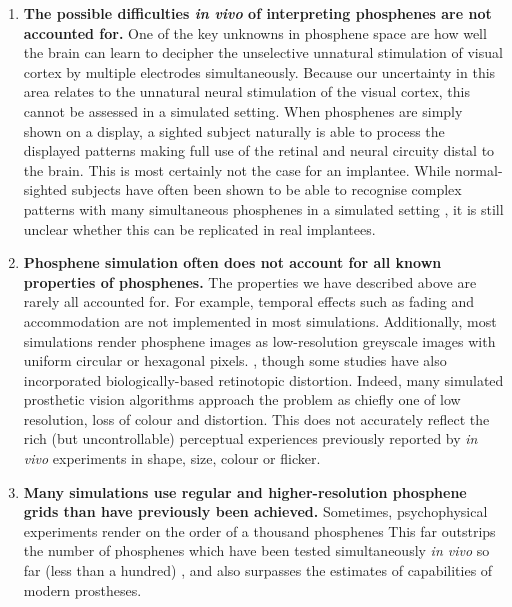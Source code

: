 \documentclass[a4paper,11pt,openany]{book}
\begin{document}
\begin{enumerate}
\item \textbf{The possible difficulties \emph{in vivo} of interpreting phosphenes are not accounted for.}
One of the key unknowns in phosphene space are how well the brain can learn to decipher the unselective unnatural stimulation of visual cortex by multiple electrodes simultaneously. \cite{beyeler_learning_2017}
Because our uncertainty in this area relates to the unnatural neural stimulation of the visual cortex, this cannot be assessed in a simulated setting.
When phosphenes are simply shown on a display, a sighted subject naturally is able to process the displayed patterns making full use of the retinal and neural circuity distal to the brain.
This is most certainly not the case for an implantee.
While normal-sighted subjects have often been shown to be able to recognise complex patterns with many simultaneous phosphenes in a simulated setting \cite{chen_simulating_2009}, it is still unclear whether this can be replicated in real implantees.
\item \textbf{Phosphene simulation often does not account for all known properties of phosphenes.}
The properties we have described above are rarely all accounted for.
For example, temporal effects such as fading and accommodation are not implemented in most simulations.
Additionally, most simulations render phosphene images as low-resolution greyscale images with uniform circular \cite{mccarthy_mobility_2014,hu_recognition_2014,sanchez-garcia_structural_2018,li_image_2018} or hexagonal pixels. \cite{chen_effect_2004}, though some studies have also incorporated biologically-based retinotopic distortion. \cite{josh_real-time_2011,josh_psychophysics_2013}
Indeed, many simulated prosthetic vision algorithms approach the problem as chiefly one of low resolution, loss of colour and distortion.
This does not accurately reflect the rich (but uncontrollable) perceptual experiences previously reported by \emph{in vivo} experiments in shape, size, colour or flicker.
\item \textbf{Many simulations use regular and higher-resolution phosphene grids than have previously been achieved.}
Sometimes, psychophysical experiments render on the order of a thousand phosphenes \cite{sanchez-garcia_structural_2018,li_image_2018,guo_optimization_2018}
This far outstrips the number of phosphenes which have been tested simultaneously \emph{in vivo} so far (less than a hundred) \cite{dobelle_artificial_2000}, and also surpasses the estimates of capabilities of modern prostheses. \cite{lewis_restoration_2015}

\end{enumerate}
\end{document}
